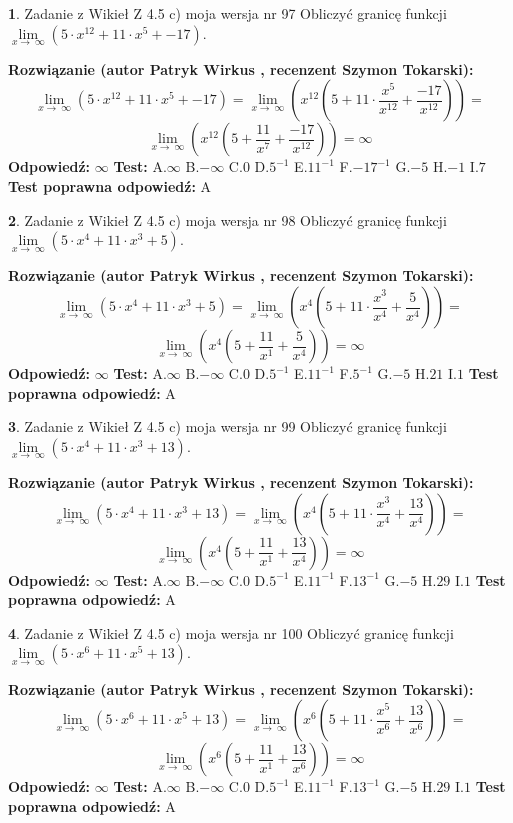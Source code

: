 \documentclass[12pt, a4paper]{article}
\theoremstyle{definition} %
\newtheorem{zad}{}
\newcommand{\zadStart}[1]{\begin{zad}#1\newline}
\newcommand{\zadStop}{\end{zad}}
\newcommand{\rozwStart}[2]{\noindent \textbf{Rozwiązanie (autor #1 , recenzent #2): }\newline}
\newcommand{\rozwStop}{\newline}
\newcommand{\odpStart}{\noindent \textbf{Odpowiedź:}\newline}
\newcommand{\odpStop}{\newline}
\newcommand{\testStart}{\noindent \textbf{Test:}\newline}
\newcommand{\testStop}{\newline}
\newcommand{\kluczStart}{\noindent \textbf{Test poprawna odpowiedź:}\newline}
\newcommand{\kluczStop}{\newline}
\begin{document}
\zadStart{Zadanie z Wikieł Z 4.5 c) moja wersja nr 97}
Obliczyć granicę funkcji  $\lim\limits_{x\to\ \infty}(5 \cdot x^{12}+11 \cdot x^{5}+-17)$.
\zadStop
\rozwStart{Patryk Wirkus}{Szymon Tokarski}
$$\lim\limits_{x\to\ \infty}(5 \cdot x^{12}+11 \cdot x^{5}+-17) = \lim\limits_{x\to\ \infty}(x^{12}(5 +11 \cdot \frac{x^{5}}{x^{12}}+\frac{-17}{x^{12}})) =$$ $$\lim\limits_{x\to\ \infty}(x^{12}(5 +\frac{11}{x^{7}}+\frac{-17}{x^{12}})) =\infty$$
\rozwStop
\odpStart
$\infty$
\odpStop
\testStart
A.$\infty$ B.$-\infty$ C.$0$ D.$5^{-1}$ E.$11^{-1}$
F.$-17^{-1}$ G.$-5$
H.$-1$
I.$7$
\testStop
\kluczStart
A
\kluczStop



\zadStart{Zadanie z Wikieł Z 4.5 c) moja wersja nr 98}
Obliczyć granicę funkcji  $\lim\limits_{x\to\ \infty}(5 \cdot x^{4}+11 \cdot x^{3}+5)$.
\zadStop
\rozwStart{Patryk Wirkus}{Szymon Tokarski}
$$\lim\limits_{x\to\ \infty}(5 \cdot x^{4}+11 \cdot x^{3}+5) = \lim\limits_{x\to\ \infty}(x^{4}(5 +11 \cdot \frac{x^{3}}{x^{4}}+\frac{5}{x^{4}})) =$$ $$\lim\limits_{x\to\ \infty}(x^{4}(5 +\frac{11}{x^{1}}+\frac{5}{x^{4}})) =\infty$$
\rozwStop
\odpStart
$\infty$
\odpStop
\testStart
A.$\infty$ B.$-\infty$ C.$0$ D.$5^{-1}$ E.$11^{-1}$
F.$5^{-1}$ G.$-5$
H.$21$
I.$1$
\testStop
\kluczStart
A
\kluczStop



\zadStart{Zadanie z Wikieł Z 4.5 c) moja wersja nr 99}
Obliczyć granicę funkcji  $\lim\limits_{x\to\ \infty}(5 \cdot x^{4}+11 \cdot x^{3}+13)$.
\zadStop
\rozwStart{Patryk Wirkus}{Szymon Tokarski}
$$\lim\limits_{x\to\ \infty}(5 \cdot x^{4}+11 \cdot x^{3}+13) = \lim\limits_{x\to\ \infty}(x^{4}(5 +11 \cdot \frac{x^{3}}{x^{4}}+\frac{13}{x^{4}})) =$$ $$\lim\limits_{x\to\ \infty}(x^{4}(5 +\frac{11}{x^{1}}+\frac{13}{x^{4}})) =\infty$$
\rozwStop
\odpStart
$\infty$
\odpStop
\testStart
A.$\infty$ B.$-\infty$ C.$0$ D.$5^{-1}$ E.$11^{-1}$
F.$13^{-1}$ G.$-5$
H.$29$
I.$1$
\testStop
\kluczStart
A
\kluczStop



\zadStart{Zadanie z Wikieł Z 4.5 c) moja wersja nr 100}
Obliczyć granicę funkcji  $\lim\limits_{x\to\ \infty}(5 \cdot x^{6}+11 \cdot x^{5}+13)$.
\zadStop
\rozwStart{Patryk Wirkus}{Szymon Tokarski}
$$\lim\limits_{x\to\ \infty}(5 \cdot x^{6}+11 \cdot x^{5}+13) = \lim\limits_{x\to\ \infty}(x^{6}(5 +11 \cdot \frac{x^{5}}{x^{6}}+\frac{13}{x^{6}})) =$$ $$\lim\limits_{x\to\ \infty}(x^{6}(5 +\frac{11}{x^{1}}+\frac{13}{x^{6}})) =\infty$$
\rozwStop
\odpStart
$\infty$
\odpStop
\testStart
A.$\infty$ B.$-\infty$ C.$0$ D.$5^{-1}$ E.$11^{-1}$
F.$13^{-1}$ G.$-5$
H.$29$
I.$1$
\testStop
\kluczStart
A
\kluczStop
\end{document}
